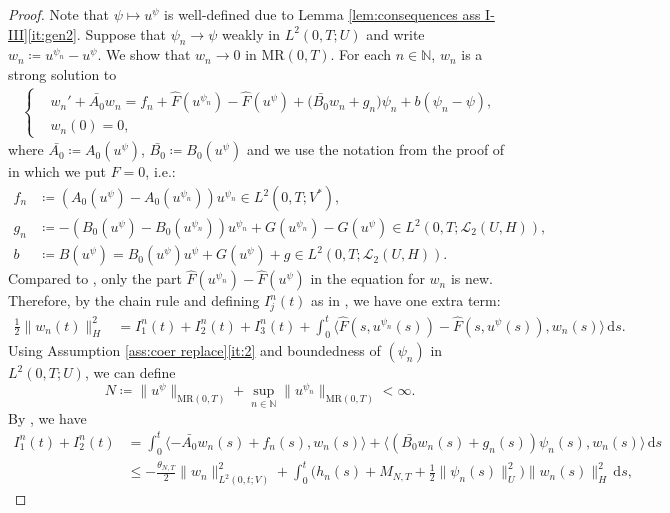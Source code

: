 \documentclass{amsart}
\newcommand{\dd}{\,\mathrm{d}}
\renewcommand{\MR}{\mathrm{MR}}
\newcommand{\UH}{\mathscr{L}_2(U,H)}
\newcommand{\<}{\langle}
\newcommand{\?}{\rangle}
\theoremstyle{plain}
\theoremstyle{remark}
\theoremstyle{plain}
\numberwithin{equation}{section}
\def\N{{\mathbb N}}
\begin{document}
\begin{proof} 
Note that $\psi \mapsto u^{\psi}$ is well-defined due to Lemma \ref{lem:consequences ass I-III}\ref{it:gen2}. 
Suppose that $\psi_n \to \psi$ weakly in $L^2(0,T;U)$ and write $w_n\coloneqq u^{\psi_n}-u^\psi$. We show that $w_n\to 0$ in $\MR(0,T)$.
For each $n\in\N$, $w_n$ is a strong solution to
\begin{align*}
\begin{cases}
  &w_n'+\bar{A_0} w_n=f_n +\hat{F}(u^{\psi_n})-\hat{F}(u^\psi)+\big(\bar{B_0} w_n+g_n\big)\psi_n+{b}(\psi_n-\psi), \\
  &w_n(0)=0,
\end{cases}
\end{align*}
where $\bar{A_0}\coloneqq A_0 (u^\psi)$, $\bar{B_0}\coloneqq B_0(u^\psi)$ and we use the notation from the proof of \cite[Prop.\ 4.9]{TV24} in which we put $F=0$, i.e.:
\begin{align*}
f_n&\coloneqq (A_0(u^\psi)-A_0(u^{\psi_n}))u^{\psi_n}\in L^2(0,T;V^*),\\
g_n&\coloneqq -(B_0(u^\psi)-B_0(u^{\psi_n}))u^{\psi_n}+G(u^{\psi_n})-G(u^\psi)\in L^2(0,T;\UH),\\
{b}&\coloneqq B(u^\psi)=B_0(u^\psi) u^\psi+G(u^\psi)+g\in L^2(0,T;\UH).
\end{align*}
Compared to \cite[Prop.\ 4.9]{TV24}, only the part  $\hat{F}(u^{\psi_n})-\hat{F}(u^\psi)$ in the equation for $w_n$ is new. 
Therefore, by the chain rule \cite[(A.2)]{TV24} and defining $I_j^n(t)$ as in  \cite[(4.18)]{TV24}, we have one extra term: 
\begin{align}
 \frac{1}{2} \|w_n(t)\|_H^2 &=  I_1^n(t)+I_2^n(t)+I_3^n(t)+ \int_0^t\<\hat{F}(s,u^{\psi_n}(s))-\hat{F}(s,u^\psi(s)),w_n(s)\?\dd s. \label{eq: gronwall prep w_n}
\end{align}
Using Assumption \ref{ass:coer replace}\ref{it:2} and boundedness of $(\psi_n)$ in $L^2(0,T;U)$, we can define 
\begin{equation}\label{eq: def N}
N\coloneqq  \|u^\psi\|_{\MR(0,T)}+\sup_{n\in\N}\|u^{\psi_n}\|_{\MR(0,T)} <\infty.
\end{equation}  
By \cite[(4.18), (4.20), (4.23), p.\ 27]{TV24}, we have  
\begin{align*}
I_1^n(t)+I_2^n(t)&= \int_0^t  \<-\bar{A_0}w_n(s)+f_n(s),w_n(s)\?+\<(\bar{B_0}w_n(s)+g_n(s))\psi_n(s),w_n(s)\?\dd s\\ 
&\leq -\frac{\theta_{N,T}}{2} \|w_n\|_{L^2(0,t;V)}^2+\int_0^t \big(h_n(s)+M_{N,T}+\frac{1}{2}\|\psi_n(s)\|_U^2\big)\|w_n(s)\|_{H}^2\dd s, 
\end{align*}

\end{proof}
\end{document}
